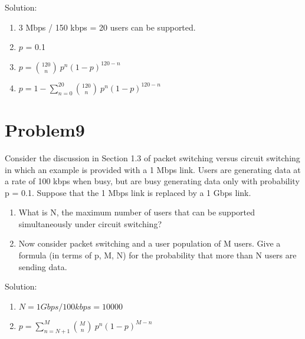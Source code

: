 \documentclass{article}
\begin{document}
  
  Solution: 
  \begin{enumerate}
  \item 3 Mbps / 150 kbps = 20 users can be supported.
  \item $p$ = 0.1
  \item $p = \binom{120}{n}\ p^n(1-p)^{120-n}$
  \item $p = 1 - \sum_{n=0}^{20} \binom{120}{n}\ p^n(1-p)^{120-n}$ 
  \end{enumerate}
\newpage
\section{Problem9} Consider the discussion in Section 1.3 of packet switching versus circuit switching in which an example is provided with a 1 Mbps link. Users are generating data at a rate of 100 kbps when busy, but are busy generating data only with probability p = 0.1. Suppose that the 1 Mbps link is replaced by a 1 Gbps link.
  \begin{enumerate}
  \item What is N, the maximum number of users that can be supported simultaneously under circuit switching?
  \item Now consider packet switching and a user population of M users. Give a formula (in terms of p, M, N) for the probability that more than N users are sending data.
  \end{enumerate}
  
  
  Solution: 
  \begin{enumerate}
  \item $N = 1Gbps / 100kbps = 10000$
  \item $p = \sum_{n=N+1}^{M} \binom{M}{n}\ p^n(1-p)^{M-n}$
  \end{enumerate}
\end{document}
